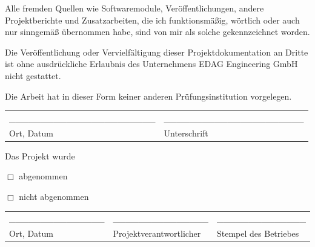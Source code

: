 \documentclass[11pt,a4paper]{report}
\begin{document}
Alle fremden Quellen wie Softwaremodule, Veröffentlichungen, andere Projektberichte und 
Zusatzarbeiten, die ich funktionsmäßig, wörtlich oder auch nur sinngemäß übernommen 
habe, sind von mir als solche gekennzeichnet worden.

\vspace{0.5cm}

Die Veröffentlichung oder Vervielfältigung dieser Projektdokumentation an Dritte ist ohne ausdrückliche Erlaubnis des Unternehmens EDAG Engineering GmbH nicht gestattet.

\vspace{0.5cm}

Die Arbeit hat in dieser Form keiner anderen Prüfungsinstitution vorgelegen.

\vspace{2cm}
\noindent
\begin{tabular}{@{}p{7cm}p{6cm}@{}}
\_\_\_\_\_\_\_\_\_\_\_\_\_\_\_\_\_\_\_\_\_\_\_ & \_\_\_\_\_\_\_\_\_\_\_\_\_\_\_\_\_\_\_\_\_\_ \\
Ort, Datum & Unterschrift \\
\end{tabular}

\vspace{2cm}

\noindent
Das Projekt wurde

\vspace{0.5cm}

\noindent
$\Box$ abgenommen

\noindent
$\Box$ nicht abgenommen

\vspace{2cm}

\noindent
\begin{tabular}{@{}p{5cm}p{6cm}p{4cm}@{}}
\_\_\_\_\_\_\_\_\_\_\_\_\_\_\_ & \_\_\_\_\_\_\_\_\_\_\_\_\_\_\_ & \_\_\_\_\_\_\_\_\_\_\_\_\_\_ \\
Ort, Datum & Projektverantwortlicher & Stempel des Betriebes \\
\end{tabular}

\clearpage



\makeatletter
\let\ps@plain\ps@empty
\makeatother

\tableofcontents
\clearpage
\listoffigures
\clearpage
\listoftables
\clearpage

\printglossary[type=\acronymtype,title=Abkürzungsverzeichnis]
\clearpage
\end{document}
